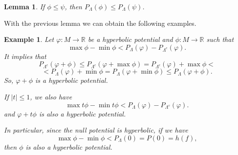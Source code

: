 \documentclass[12pt,a4paper]{amsart}
\theoremstyle{plain}
\newtheorem{example}{Example}[subsection]
\newtheorem{lemma}{Lemma}[subsection]
\begin{document}
\begin{lemma}
	If $\phi \leq \psi$, then $P_{\Lambda}(\phi) \leq P_{\Lambda}(\psi)$. 
\end{lemma}

With the previous lemma we can obtain the following examples.

\begin{example}
	Let $\varphi: M \to \mathbb{R}$ be a hyperbolic potential and $\phi:M \to \mathbb{R}$ such that
	\[
	\max \phi - \min \phi < P_{\Lambda}(\varphi) - P_{\Lambda^{c}}(\varphi). 
	\]
	It implies that
	\[
	P_{\Lambda^{c}}(\varphi + \phi)  \leq  P_{\Lambda^{c}}(\varphi + \max \phi) = P_{\Lambda^{c}}(\varphi) + \max \phi <
	\]
	\[
	< P_{\Lambda}(\varphi) + \min \phi = P_{\Lambda}(\varphi + \min \phi) \leq P_{\Lambda}(\varphi + \phi). 
	\]
	So, $\varphi + \phi$ is a hyperbolic potential.
	
	If $|t|\leq 1$, we also have 
	\[
	\max t\phi - \min t\phi < P_{\Lambda}(\varphi) - P_{\Lambda^{c}}(\varphi). 
	\]
	and $\varphi + t\phi$ is also a hyperbolic potential.
	
	In particular, since the null potential is hyperbolic, if we have
	\[
	\max \phi - \min \phi < P_{\Lambda}(0)=P(0)=h(f),
	\]
	then $\phi$ is also a hyperbolic potential.
\end{example}
\end{document}
